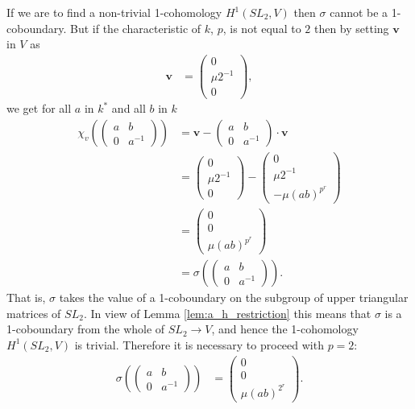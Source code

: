 			If we are to find a non-trivial 1-cohomology $H^1(SL_2, V)$ then $\sigma$ cannot be a 1-coboundary. But if the characteristic of $k$, $p$, is not equal to $2$ then by setting $\mathbf{v}$ in $V$ as
			\begin{align*}
			\mathbf{v} &= \left(\begin{matrix} 0 \\ \mu2^{-1} \\ 0 \end{matrix}\right),
			\end{align*}
			we get for all $a$ in $k^*$ and all $b$ in $k$
			\begin{align*}
	\chi_v\left(
			\left(\begin{matrix}a & b \\ 0 & a^{-1}\end{matrix}\right)
			\right) &=
	\mathbf{v}-\left(\begin{matrix}a & b \\ 0 & a^{-1}\end{matrix}\right)\cdot \mathbf{v} \\
		&=
		\left(\begin{matrix} 0 \\ \mu2^{-1} \\ 0 \end{matrix}\right) - 
\left(\begin{matrix} 0 \\ \mu2^{-1}\ \\ -\mu(ab)^{p^r} \end{matrix}\right)
	\\
		&=
		\left(\begin{matrix} 0 \\ 0 \\ \mu(ab)^{p^r} \end{matrix}\right) \\
			&=
	\sigma\left(
			\left(\begin{matrix} a & b \\ 0 & a^{-1}\end{matrix}\right)
			\right).
	\end{align*}
	That is, $\sigma$ takes the value of a 1-coboundary on the subgroup of upper triangular matrices of $SL_2$. In view of Lemma \ref{lem:a_h_restriction} this means that $\sigma$ is a 1-coboundary from the whole of $SL_2 \rightarrow V$, and hence the 1-cohomology $H^1(SL_2, V)$ is trivial. Therefore it is necessary to proceed with $p=2$:
	\begin{align}
	\label{b2a:b}
	\sigma\left(
			\left(\begin{matrix} a & b \\ 0 & a^{-1}\end{matrix}\right)
			\right) 
	&=
	\left(\begin{matrix} 0 \\ 0 \\ \mu(ab)^{2^{r}}\end{matrix}\right).
	\end{align}

